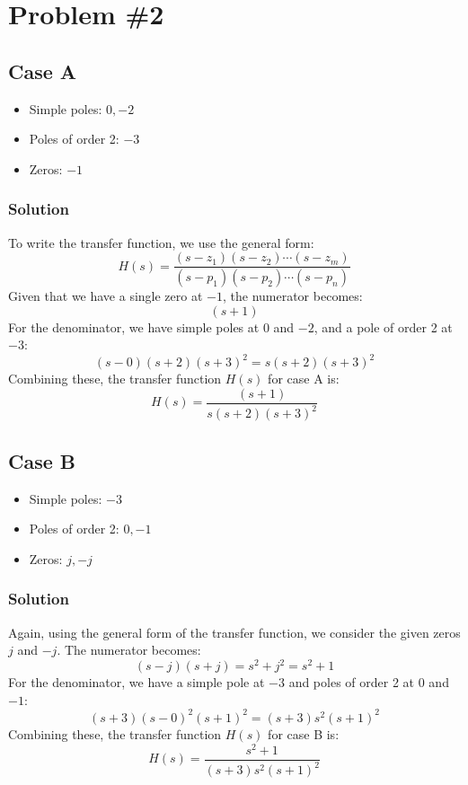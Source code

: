 \documentclass[12pt]{article}
\begin{document}
\newpage
\section*{Problem \#2}

\subsection*{Case A}

\begin{itemize}
  \item Simple poles: \(0, -2\)
  \item Poles of order 2: \(-3\)
  \item Zeros: \(-1\)
\end{itemize}

\subsubsection*{Solution}
To write the transfer function, we use the general form:
\[
H(s) = \frac{(s - z_1)(s - z_2) \cdots (s - z_m)}{(s - p_1)(s - p_2) \cdots (s - p_n)}
\]
Given that we have a single zero at \(-1\), the numerator becomes:
\[
(s + 1)
\]
For the denominator, we have simple poles at \(0\) and \(-2\), and a pole of order 2 at \(-3\):
\[
(s - 0)(s + 2)(s + 3)^2 = s(s + 2)(s + 3)^2
\]
Combining these, the transfer function \(H(s)\) for case A is:
\[
H(s) = \frac{(s + 1)}{s(s + 2)(s + 3)^2}
\]

\subsection*{Case B}
\begin{itemize}
  \item Simple poles: \(-3\)
  \item Poles of order 2: \(0, -1\)
  \item Zeros: \(j, -j\)
\end{itemize}

\subsubsection*{Solution}
Again, using the general form of the transfer function, we consider the given zeros \(j\) and \(-j\). The numerator becomes:
\[
(s - j)(s + j) = s^2 + j^2 = s^2 + 1
\]
For the denominator, we have a simple pole at \(-3\) and poles of order 2 at \(0\) and \(-1\):
\[
(s + 3)(s - 0)^2(s + 1)^2 = (s + 3)s^2(s + 1)^2
\]
Combining these, the transfer function \(H(s)\) for case B is:
\[
H(s) = \frac{s^2 + 1}{(s + 3)s^2(s + 1)^2}
\]
\newpage
\end{document}
